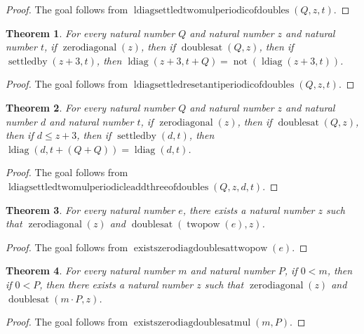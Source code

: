 \documentclass[11pt]{article}
\newtheorem{theorem}{Theorem}[section]
\theoremstyle{definition}
\begin{document}
\begin{proof}
The goal follows from \(\operatorname{ldiagsettledtwomulperiodicofdoubles}(Q, z, t)\).
\end{proof}
\begin{theorem}
\label{ll:paper:ldiag-settled-reset-antiperiodic-of-doubles}
For every natural number \(Q\) and natural number \(z\) and natural number \(t\), if \(\operatorname{zerodiagonal}(z)\), then if \(\operatorname{doublesat}(Q, z)\), then if \(\operatorname{settledby}(z + 3, t)\), then \(\operatorname{ldiag}(z + 3, t + Q) = \operatorname{not}(\operatorname{ldiag}(z + 3, t))\).
\end{theorem}
\begin{proof}
The goal follows from \(\operatorname{ldiagsettledresetantiperiodicofdoubles}(Q, z, t)\).
\end{proof}
\begin{theorem}
\label{ll:paper:ldiag-settled-two-mul-periodic-le-add-three-of-doubles}
For every natural number \(Q\) and natural number \(z\) and natural number \(d\) and natural number \(t\), if \(\operatorname{zerodiagonal}(z)\), then if \(\operatorname{doublesat}(Q, z)\), then if \(d \le z + 3\), then if \(\operatorname{settledby}(d, t)\), then \(\operatorname{ldiag}(d, t + (Q + Q)) = \operatorname{ldiag}(d, t)\).
\end{theorem}
\begin{proof}
The goal follows from \(\operatorname{ldiagsettledtwomulperiodicleaddthreeofdoubles}(Q, z, d, t)\).
\end{proof}
\begin{theorem}
\label{ll:paper:exists-zero-diag-doublesat-twopow}
For every natural number \(e\), there exists a natural number \(z\) such that \(\operatorname{zerodiagonal}(z)\) and \(\operatorname{doublesat}(\operatorname{twopow}(e), z)\).
\end{theorem}
\begin{proof}
The goal follows from \(\operatorname{existszerodiagdoublesattwopow}(e)\).
\end{proof}
\begin{theorem}
\label{ll:paper:exists-zero-diag-doublesat-mul}
For every natural number \(m\) and natural number \(P\), if \(0 < m\), then if \(0 < P\), then there exists a natural number \(z\) such that \(\operatorname{zerodiagonal}(z)\) and \(\operatorname{doublesat}(m \cdot P, z)\).
\end{theorem}
\begin{proof}
The goal follows from \(\operatorname{existszerodiagdoublesatmul}(m, P)\).
\end{proof}
\end{document}
